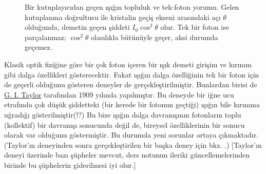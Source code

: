 \documentclass[00_kitap.tex]{subfiles}
\begin{document}
\begin{figure}[htbp]
	\caption{Bir kutuplayıcıdan geçen ışığın topluluk ve tek-foton yorumu.
		Gelen kutuplanma doğrultusu ile kristalin geçiş ekseni arasındaki açı
		$\theta$ olduğunda, demetin geçen şiddeti $I_0\cos^2\theta$ olur. Tek bir
		foton ise parçalanmaz; $\cos^2\theta$ olasılıkla bütünüyle geçer, aksi
		durumda geçemez. %
		}
	\label{fig:tek-foton-kutuplanma}
\end{figure}



Klasik optik fiziğine göre  bir çok foton içeren bir ışık demeti girişim ve kırınım gibi dalga özellikleri gösterecektir. Fakat ışığın dalga özelliğinin tek bir foton için de geçerli olduğunu gösteren deneyler de gerçekleştirilmiştir. Bunlardan birisi de \href{https://en.wikipedia.org/wiki/G._I._Taylor#Career_and_research}{G. I. Taylor} tarafından 1909 yılında yapılmıştır. Bu deneyde bir iğne ucu etrafında çok düşük şiddetteki (bir kerede bir fotonun geçtiği) ışığın bile kırınıma uğradığı gösterilmiştir(!?) Bu bize ışığın dalga davranışının fotonların toplu (kollektif) bir davranışı sonucunda değil de, bireysel özelliklerinin bir sonucu olarak var olduğunu göstermiştir. Bu durumda yeni sorunlar ortaya çıkmaktadır. {\color{red} (Taylor'ın deneyinden sonra gerçekleştirilen bir başka deney için bkz. \cite{Grangier_1986}.)} {\color{gray} [Taylor'ın deneyi üzerinde bazı şüpheler mevcut, ders notunun ileriki güncellemelerinden birinde bu şüphelerin giderilmesi iyi olur.]}

\end{document}
